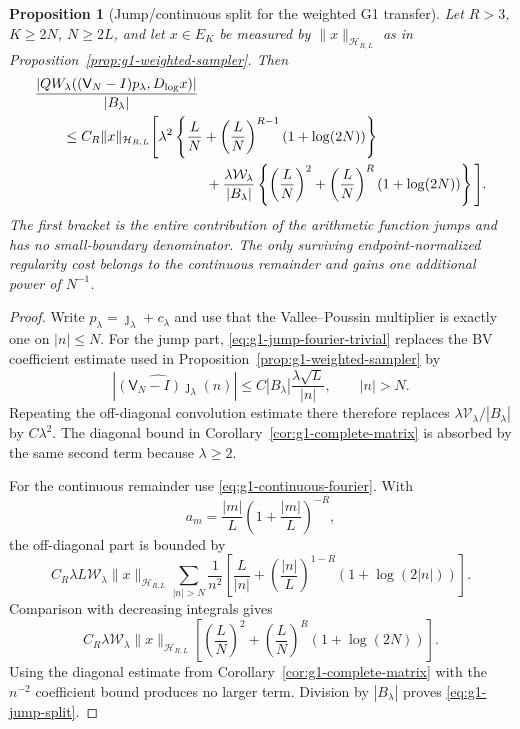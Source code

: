 \documentclass[11pt]{article}
\newtheorem{proposition}[theorem]{Proposition}
\theoremstyle{remark}
\begin{document}
\begin{proposition}[Jump/continuous split for the weighted G1 transfer]\label{prop:g1-jump-split}
Let $R>3$, $K\ge2N$, $N\ge2L$, and let $x\in E_K$ be measured by
$\|x\|_{\mathcal H_{R,L}}$ as in
Proposition~\ref{prop:g1-weighted-sampler}.  Then
\begin{align}
 &\frac{
 |QW_\lambda((\mathsf V_N-I)p_\lambda,D_{\log}x)|
 }{|B_\lambda|}
 \notag\\
 &\qquad\le C_R\|x\|_{\mathcal H_{R,L}}
 \Bigg[
 \lambda^2\left\{
 \frac LN+
 \left(\frac LN\right)^{R-1}(1+\log(2N))
 \right\}
 \label{eq:g1-jump-split}\\
 &\hspace{43mm}
 +\frac{\lambda\mathcal W_\lambda}{|B_\lambda|}
 \left\{
 \left(\frac LN\right)^2+
 \left(\frac LN\right)^R(1+\log(2N))
 \right\}
 \Bigg].\notag
\end{align}
The first bracket is the entire contribution of the arithmetic function jumps
and has no small-boundary denominator.  The only surviving endpoint-normalized
regularity cost belongs to the continuous remainder and gains one additional
power of $N^{-1}$.
\end{proposition}
\begin{proof}
Write
$p_\lambda=\jmath_\lambda+c_\lambda$ and use that the
Vallee--Poussin multiplier is exactly one on $|n|\le N$.  For the jump part,
\eqref{eq:g1-jump-fourier-trivial} replaces the BV coefficient estimate used
in Proposition~\ref{prop:g1-weighted-sampler} by
\[
 |\widehat{(\mathsf V_N-I)\jmath_\lambda}(n)|
 \le C|B_\lambda|\frac{\lambda\sqrt L}{|n|},
 \qquad |n|>N.
\]
Repeating the off-diagonal convolution estimate there therefore replaces
$\lambda\mathcal V_\lambda/|B_\lambda|$ by $C\lambda^2$.  The diagonal
bound in Corollary~\ref{cor:g1-complete-matrix} is absorbed by the same
second term because $\lambda\ge2$.

For the continuous remainder use \eqref{eq:g1-continuous-fourier}.  With
\[
 a_m=\frac{|m|}{L}\left(1+\frac{|m|}{L}\right)^{-R},
\]
the off-diagonal part is bounded by
\[
 C_R\lambda L\mathcal W_\lambda
 \|x\|_{\mathcal H_{R,L}}
 \sum_{|n|>N}\frac1{n^2}
 \left[
 \frac L{|n|}+
 \left(\frac{|n|}{L}\right)^{1-R}
 (1+\log(2|n|))
 \right].
\]
Comparison with decreasing integrals gives
\[
 C_R\lambda\mathcal W_\lambda
 \|x\|_{\mathcal H_{R,L}}
 \left[
 \left(\frac LN\right)^2+
 \left(\frac LN\right)^R(1+\log(2N))
 \right].
\]
Using the diagonal estimate from
Corollary~\ref{cor:g1-complete-matrix} with the $n^{-2}$ coefficient bound
produces no larger term.  Division by $|B_\lambda|$ proves
\eqref{eq:g1-jump-split}.
\end{proof}
\end{document}
